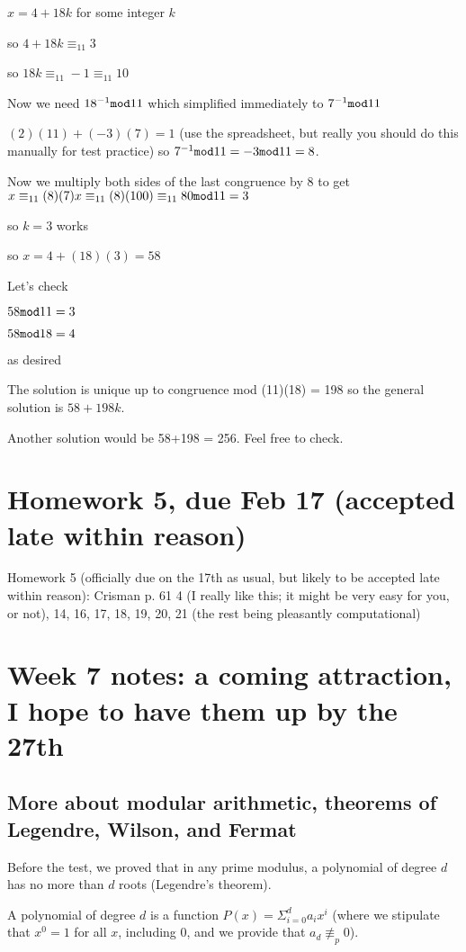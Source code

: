 \documentclass[12pt]{article}
\begin{document}
$x=4+18k$ for some integer $k$

so $4+18k \equiv_{11} 3$

so $18k \equiv_{11} -1 \equiv_{11} 10$

Now we need $18^{-1}{\tt mod}11$ which simplified immediately to $7^{-1}{\tt mod} 11$

$(2)(11)+(-3)(7)=1$ (use the spreadsheet, but really you should do this manually for test practice) so $7^{-1}{\tt mod}11 = -3 {\tt mod}11 = 8$.

Now we multiply both sides of the last congruence by 8 to get $x \equiv_{11} (8)(7)x \equiv_{11} (8)(100) \equiv_{11} 80 {\tt mod} 11 = 3$

so $k=3$ works

so $x = 4+(18)(3) =58$

Let's check

$58 {\tt mod} 11 =3$

$58{\tt mod} 18 = 4$

as desired

The solution is unique up to congruence mod (11)(18) = 198 so the general solution is $58 + 198k$.

Another solution would be 58+198 = 256.  Feel free to check.

\section{Homework 5, due Feb 17 (accepted late within reason)}

Homework 5 (officially due on the 17th as usual, but likely to be accepted late within reason): Crisman p. 61 4 (I really like this; it might be very easy for you, or not), 14, 16, 17, 18, 19, 20, 21 (the rest being pleasantly computational)

\section{Week 7 notes:  a coming attraction, I hope to have them up by the 27th}

\subsection{More about modular arithmetic, theorems of Legendre, Wilson, and Fermat}

Before the test, we proved that in any prime modulus, a polynomial of degree $d$ has no more than $d$ roots (Legendre's theorem).

A polynomial of degree $d$ is a function $P(x) = \Sigma_{i=0}^da_ix^i$ (where we stipulate that $x^0=1$ for all $x$, including 0, and we provide that $a_d \not\equiv_p  0$).
\end{document}
